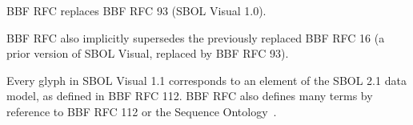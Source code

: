 
BBF RFC \rfcnum{} replaces BBF RFC 93 (SBOL Visual 1.0).

BBF RFC \rfcnum{} also implicitly supersedes the previously replaced BBF RFC 16 (a prior version of SBOL Visual, replaced by BBF RFC 93).

Every glyph in SBOL Visual 1.1 corresponds to an element of the SBOL 2.1 data model, as defined in BBF RFC 112.
BBF RFC \rfcnum{} also defines many terms by reference to BBF RFC 112
or the Sequence Ontology~\citep{SequenceOntology}.


